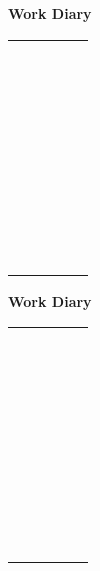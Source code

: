 \documentclass{article}
\begin{document}
\newcommand{\checklist}[2]{
\begin{table}[ht!]

{\bf \Large {Work Diary {#1}}}
{\bf \phantom{x}{#2}\,}

\centering
\begin{tabular}{rcccr}
\blankrow\\
\blankrow\\
\headingline\\
\hline

\planitem{ 6:00}\\ \hline
\planitem{ 7:00}\\ \hline
\planitem{ 8:00}\\ \hline
\planitem{ 9:00}\\ \hline
\planitem{10:00}\\ \hline
\planitem{11:00}\\ \hline
\planitem{12:00}\\ \hline
\planitem{13:00}\\ \hline
\planitem{14:00}\\ \hline
\planitem{15:00}\\ \hline
\planitem{16:00}\\ \hline
\planitem{17:00}\\ \hline
\planitem{18:00}\\ \hline
\planitem{19:00}\\ \hline
\planitem{20:00}\\ \hline
\planitem{21:00}\\ \hline
\planitem{22:00}\\ \hline
\planitem{23:00}\\ \hline
\planitem{ 0:00}\\ \hline
\planitem{ 1:00}\\ \hline
\planitem{ 2:00}\\ \hline
\blankrow\\
\blankrow\\

\memotitle{Memo} \\ \hline
\blankrow\\
\blankrow\\
\blankrow\\
\blankrow\\
\blankrow\\
\blankrow\\
\blankrow\\
\blankrow\\
\blankrow\\
\blankrow\\
\blankrow\\
\blankrow\\
\hline
\end{tabular}
\end{table}
}


\checklist{\underline{\makebox[3.77cm][l]{}}}{\Sun\phantom{xxx}\SunCloud\phantom{xxx}\FilledRainCloud\phantom{xxx}}
\clearpage
\checklist{\underline{\makebox[3.77cm][l]{}}}{\Sun\phantom{xxx}\SunCloud\phantom{xxx}\FilledRainCloud\phantom{xxx}}
\clearpage
\end{document}
